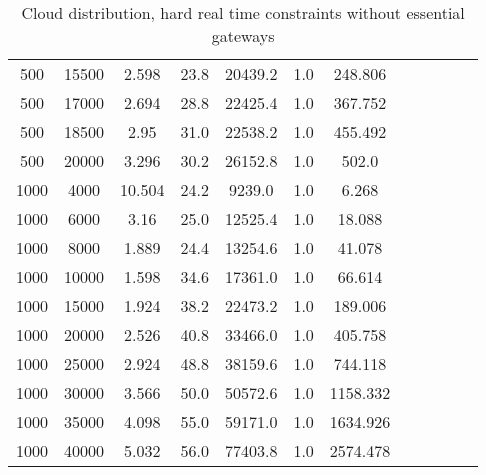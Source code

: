 \begin{table}[htb]
\begin{tabular}{|c|c|c|c|c|c|c|c|c|c|c|c|}
		500 & 15500 & 2.598 & 23.8 & 20439.2 & 1.0 & 248.806 & & & & &  \\ 
		500 & 17000 & 2.694 & 28.8 & 22425.4 & 1.0 & 367.752 & & & & &  \\ 
		500 & 18500 & 2.95 & 31.0 & 22538.2 & 1.0 & 455.492 & & & & &  \\ 
		500 & 20000 & 3.296 & 30.2 & 26152.8 & 1.0 & 502.0 & & & & &  \\ 
		1000 & 4000 & 10.504 & 24.2 & 9239.0 & 1.0 & 6.268 & & & & &  \\ 
		1000 & 6000 & 3.16 & 25.0 & 12525.4 & 1.0 & 18.088 & & & & &  \\ 
		1000 & 8000 & 1.889 & 24.4 & 13254.6 & 1.0 & 41.078 & & & & &  \\ 
		1000 & 10000 & 1.598 & 34.6 & 17361.0 & 1.0 & 66.614 & & & & &  \\ 
		1000 & 15000 & 1.924 & 38.2 & 22473.2 & 1.0 & 189.006 & & & & &  \\ 
		1000 & 20000 & 2.526 & 40.8 & 33466.0 & 1.0 & 405.758 & & & & &  \\ 
		1000 & 25000 & 2.924 & 48.8 & 38159.6 & 1.0 & 744.118 & & & & &  \\ 
		1000 & 30000 & 3.566 & 50.0 & 50572.6 & 1.0 & 1158.332 & & & & &  \\ 
		1000 & 35000 & 4.098 & 55.0 & 59171.0 & 1.0 & 1634.926 & & & & &  \\ 
		1000 & 40000 & 5.032 & 56.0 & 77403.8 & 1.0 & 2574.478 & & & & &  \\ 
		\hline 
	\end{tabular} 
	\caption{Cloud distribution, hard real time constraints without essential gateways} 
	\label{tab:cloud_hard_n_esc} 
\end{table} 

